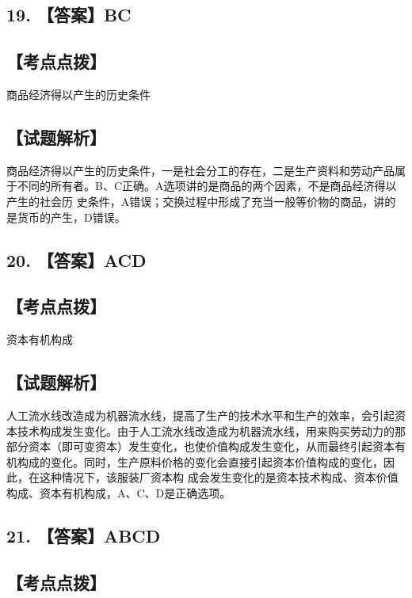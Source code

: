 \documentclass[UTF8,11pt]{ctexart}
\begin{document}
\subsection*{19. 【答案】BC}

\subsection*{【考点点拨】}

商品经济得以产生的历史条件


\subsection*{【试题解析】}

商品经济得以产生的历史条件，一是社会分工的存在，二是生产资料和劳动产品属于不同的所有者。B、C正确。A选项讲的是商品的两个因素，不是商品经济得以产生的社会历 史条件，A错误；交换过程中形成了充当一般等价物的商品，讲的是货币的产生，D错误。


\subsection*{20. 【答案】ACD}

\subsection*{【考点点拨】}

资本有机构成


\subsection*{【试题解析】}

人工流水线改造成为机器流水线，提高了生产的技术水平和生产的效率，会引起资 本技术构成发生变化。由于人工流水线改造成为机器流水线，用来购买劳动力的那部分资本（即可变资本）发生变化，也使价值构成发生变化，从而最终引起资本有机构成的变化。同时，生产原料价格的变化会直接引起资本价值构成的变化，因此，在这种情况下，该服装厂资本构 成会发生变化的是资本技术构成、资本价值构成、资本有机构成，A、C、D是正确选项。


\subsection*{21. 【答案】ABCD}

\subsection*{【考点点拨】}
\end{document}

